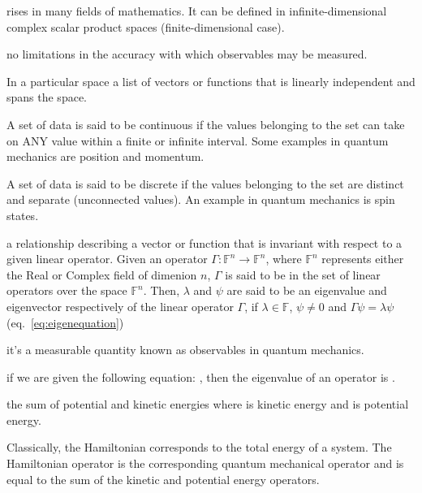 \documentclass[12pt,]{book}
\providecommand{\tightlist}{%
  \setlength{\itemsep}{0pt}\setlength{\parskip}{0pt}}
\begin{document}
\begin{description}
\tightlist
\item[Adjoint]
rises in many fields of mathematics. It can be defined in
infinite-dimensional complex scalar product spaces (finite-dimensional
case).
\item[Boundary Conditions]
\item[Classical Mechanics]
no limitations in the accuracy with which observables may be measured.
\item[Complete Basis Set]
In a particular space a list of vectors or functions that is linearly
independent and spans the space.
\item[Continuous]
A set of data is said to be continuous if the values belonging to the
set can take on ANY value within a finite or infinite interval. Some
examples in quantum mechanics are position and momentum.
\item[Difference Matrix]
\item[Differentiable]
\item[Differential Operator]
\item[Discrete]
A set of data is said to be discrete if the values belonging to the set
are distinct and separate (unconnected values). An example in quantum
mechanics is spin states.
\item[Eigenequation]
a relationship describing a vector or function that is invariant with
respect to a given linear operator. Given an operator
\(\Gamma: \mathbb{F}^n \to \mathbb{F}^n\), where \(\mathbb{F}^n\)
represents either the Real or Complex field of dimenion \(n\),
\(\Gamma\) is said to be in the set of linear operators over the space
\(\mathbb{F}^n\). Then, \(\lambda\) and \(\psi\) are said to be an
eigenvalue and eigenvector respectively of the linear operator
\(\Gamma\), if \(\lambda\in\mathbb{F}\), \(\psi\neq0\) and
\(\Gamma\psi=\lambda\psi\) (eq.~\ref{eq:eigenequation})
\item[Eigenfunction]
\item[Eigenvector]
it's a measurable quantity known as observables in quantum mechanics.
\item[Eigenvalue]
if we are given the following equation: , then the eigenvalue of an
operator is .
\item[Energy]
the sum of potential and kinetic energies where is kinetic energy and is
potential energy.
\item[Hamiltonian Operator]
Classically, the Hamiltonian corresponds to the total energy of a
system. The Hamiltonian operator is the corresponding quantum mechanical
operator and is equal to the sum of the kinetic and potential energy
operators.


\end{description}
\end{document}
